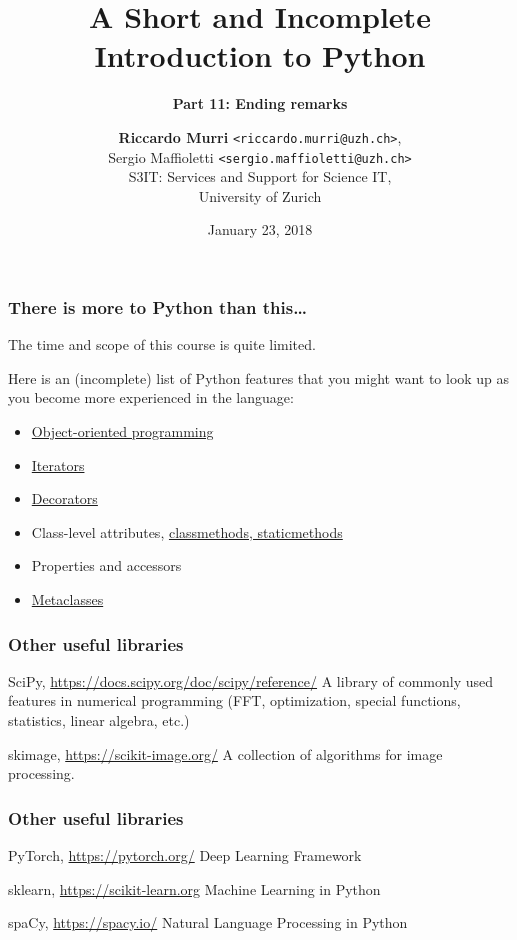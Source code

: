 \documentclass[english,serif,mathserif,xcolor=pdftex,dvipsnames,table]{beamer}
\title[Introduction to Python]{%
  A Short and Incomplete Introduction to Python
}
\subtitle{\bfseries Part 11: Ending remarks}
\author[R.~Murri]{%
  \textbf{Riccardo Murri} \texttt{<riccardo.murri@uzh.ch>}, \\
  Sergio Maffioletti \texttt{<sergio.maffioletti@uzh.ch>}
  \\
  S3IT: Services and Support for Science IT,
  \\
  University of Zurich
}
\date{January 23, 2018}
\begin{document}
\maketitle



\begin{frame}
  \frametitle{There is more to Python than this\ldots}

  The time and scope of this course is quite limited.

  \+
  Here is an (incomplete) list of Python features that you might
  want to look up as you become more experienced in the language:
  \begin{itemize}
  \item \href{https://github.com/gc3-uzh-ch/python-course}{Object-oriented programming}
  \item
    \href{http://docs.python.org/2/tutorial/classes.html\#iterators}{Iterators}
  \item
    \href{http://www.artima.com/weblogs/viewpost.jsp?thread=240808}{Decorators}
  \item Class-level attributes, \href{http://stackoverflow.com/a/12179752/1808780}{classmethods, staticmethods}
  \item Properties and accessors
  \item \href{http://stackoverflow.com/a/6581949/459543}{Metaclasses}
  \end{itemize}
\end{frame}


\begin{frame}
  \frametitle{Other useful libraries}

  \begin{describe}{SciPy, \url{https://docs.scipy.org/doc/scipy/reference/}}
    A library of commonly used features in numerical programming (FFT,
    optimization, special functions, statistics, linear algebra, etc.)
  \end{describe}

  \begin{describe}{skimage, \url{https://scikit-image.org/}}
    A collection of algorithms for image processing.
  \end{describe}
\end{frame}


\begin{frame}
  \frametitle{Other useful libraries}

  \begin{describe}{PyTorch, \url{https://pytorch.org/}}
    Deep Learning Framework
  \end{describe}

  \begin{describe}{sklearn, \url{https://scikit-learn.org}}
    Machine Learning in Python
  \end{describe}

  \begin{describe}{spaCy, \url{https://spacy.io/}}
    Natural Language Processing in Python
  \end{describe}
\end{frame}
\end{document}
